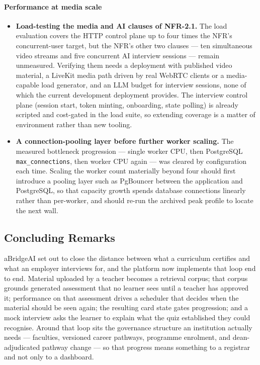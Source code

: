 \paragraph{Performance at media scale}
\begin{itemize}
    \item \textbf{Load-testing the media and AI clauses of NFR-2.1.} The load evaluation covers the HTTP control plane up to four times the NFR's concurrent-user target, but the NFR's other two clauses --- ten simultaneous video streams and five concurrent AI interview sessions --- remain unmeasured. Verifying them needs a deployment with published video material, a LiveKit media path driven by real WebRTC clients or a media-capable load generator, and an LLM budget for interview sessions, none of which the current development deployment provides. The interview control plane (session start, token minting, onboarding, state polling) is already scripted and cost-gated in the load suite, so extending coverage is a matter of environment rather than new tooling.
    \item \textbf{A connection-pooling layer before further worker scaling.} The measured bottleneck progression --- single worker CPU, then PostgreSQL \texttt{max\_connections}, then worker CPU again --- was cleared by configuration each time. Scaling the worker count materially beyond four should first introduce a pooling layer such as PgBouncer between the application and PostgreSQL, so that capacity growth spends database connections linearly rather than per-worker, and should re-run the archived peak profile to locate the next wall.
\end{itemize}

\subsection{Concluding Remarks}

aBridgeAI set out to close the distance between what a curriculum certifies and what an employer interviews for, and the platform now implements that loop end to end. Material uploaded by a teacher becomes a retrieval corpus; that corpus grounds generated assessment that no learner sees until a teacher has approved it; performance on that assessment drives a scheduler that decides when the material should be seen again; the resulting card state gates progression; and a mock interview asks the learner to explain what the quiz established they could recognise. Around that loop sits the governance structure an institution actually needs --- faculties, versioned career pathways, programme enrolment, and dean-adjudicated pathway change --- so that progress means something to a registrar and not only to a dashboard.

